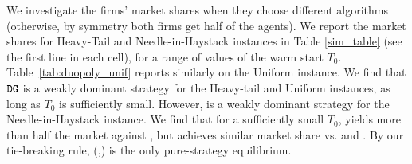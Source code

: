 \documentclass[../competing_bandits_with_appendix.tex]{subfiles}
\begin{document}




We investigate the firms' market shares when they choose different algorithms (otherwise, by symmetry both firms get half of the agents). We report the market shares for Heavy-Tail and Needle-in-Haystack instances in Table \ref{sim_table}  (see the first line in each cell), for a range of values of the warm start $T_0$. Table~\ref{tab:duopoly_unif} reports similarly on the Uniform instance. We find that $\mathtt{DG}$ is a weakly dominant strategy for the Heavy-tail and Uniform instances, as long as $T_0$ is sufficiently small. However, \TS is a weakly dominant strategy for the Needle-in-Haystack instance. We find that for a sufficiently small $T_0$, \DG yields more than half the market against \TS,  but achieves similar market share vs. \DG and \DEG. By our tie-breaking rule, (\DG,\DG) is the only pure-strategy equilibrium.
\end{document}
